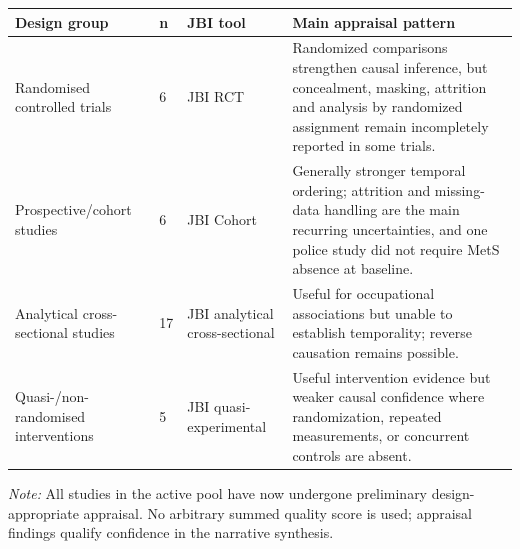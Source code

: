 \begin{tabular}{p{} p{} p{} p{}}
\toprule
Design group & n & JBI tool & Main appraisal pattern \\
\midrule
    Randomised controlled trials & 6 & JBI RCT & Randomized comparisons strengthen causal inference, but concealment, masking, attrition and analysis by randomized assignment remain incompletely reported in some trials. \\
    Prospective/cohort studies & 6 & JBI Cohort & Generally stronger temporal ordering; attrition and missing-data handling are the main recurring uncertainties, and one police study did not require MetS absence at baseline. \\
    Analytical cross-sectional studies & 17 & JBI analytical cross-sectional & Useful for occupational associations but unable to establish temporality; reverse causation remains possible. \\
    Quasi-/non-randomised interventions & 5 & JBI quasi-experimental & Useful intervention evidence but weaker causal confidence where randomization, repeated measurements, or concurrent controls are absent. \\
\bottomrule
\end{tabular}

\noindent\textit{Note:} All studies in the active pool have now undergone preliminary design-appropriate appraisal. No arbitrary summed quality score is used; appraisal findings qualify confidence in the narrative synthesis.
